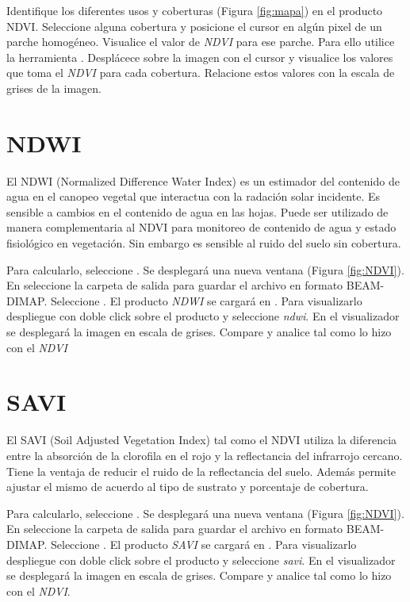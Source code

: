 Identifique los diferentes usos y coberturas (Figura \ref{fig:mapa}) en el producto NDVI. Seleccione alguna cobertura y posicione el cursor en algún pixel de un parche homogéneo. Visualice el valor de \emph{NDVI} para ese parche. Para ello utilice la herramienta  . Desplácece sobre la imagen con el cursor y visualice  los valores que toma el \emph{NDVI} para cada cobertura. Relacione estos valores con la escala de grises de la imagen.


\section{NDWI}

El NDWI (Normalized Difference Water Index) es un estimador del contenido de agua en el canopeo vegetal que interactua con la radación solar incidente. Es sensible a cambios en el contenido de agua en las hojas. Puede ser utilizado de manera complementaria al NDVI para monitoreo de contenido de agua y estado fisiológico en vegetación. Sin embargo es sensible al ruido del suelo sin cobertura.

Para calcularlo, seleccione .  Se desplegará una nueva ventana (Figura \ref{fig:NDVI}). En  seleccione la carpeta de salida para guardar el archivo en formato BEAM-DIMAP. Seleccione . El producto \emph{NDWI} se cargará en . Para visualizarlo despliegue con doble click sobre el producto  y seleccione \emph{ndwi}. En el visualizador se desplegará la imagen en escala de grises. Compare y analice tal como lo hizo con el \emph{NDVI}

\section{SAVI}

El SAVI (Soil Adjusted Vegetation Index)  tal como el NDVI utiliza la diferencia entre la absorción de la clorofila en el rojo y la reflectancia del infrarrojo cercano. Tiene la ventaja de reducir el ruido de la reflectancia del suelo. Además permite ajustar el mismo de acuerdo al tipo de sustrato y porcentaje de cobertura. %

Para calcularlo, seleccione .  Se desplegará una nueva ventana (Figura \ref{fig:NDVI}). En  seleccione la carpeta de salida para guardar el archivo en formato BEAM-DIMAP. Seleccione . El producto \emph{SAVI} se cargará en . Para visualizarlo despliegue con doble click sobre el producto  y seleccione \emph{savi}. En el visualizador se desplegará la imagen en escala de grises. Compare y analice tal como lo hizo con el \emph{NDVI}.

